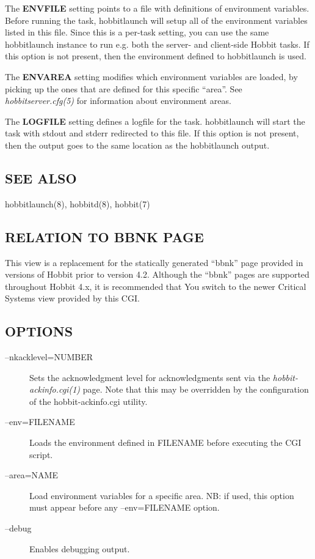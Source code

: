   The \textbf{ENVFILE}
 setting points to a file with definitions of environment
 variables. Before running the task, hobbitlaunch will setup all of
 the environment variables listed in this file. Since this is a
 per-task setting, you can use the same hobbitlaunch instance to run
 e.g. both the server- and client-side Hobbit tasks. If this option is
 not present, then the environment defined to hobbitlaunch is used. 



  The \textbf{ENVAREA}
 setting modifies which environment variables are loaded, by picking
 up the ones that are defined for this specific ``area''. See
 \emph{hobbitserver.cfg(5)} for information about environment areas. 


  The \textbf{LOGFILE}
 setting defines a logfile for the task. hobbitlaunch will start the
 task with stdout and stderr redirected to this file. If this option
 is not present, then the output goes to the same location as the
 hobbitlaunch output. 



 
\subsection{SEE ALSO}
hobbitlaunch(8), hobbitd(8), hobbit(7) 




 
\subsection{RELATION TO BBNK PAGE}
 This view is a replacement for the statically generated ``bbnk'' page
 provided in versions of Hobbit prior to version 4.2. Although the
 ``bbnk'' pages are supported throughout Hobbit 4.x, it is recommended
 that You switch to the newer Critical Systems view provided by this
 CGI. 


 
\subsection{OPTIONS}
\begin{description}
\item[--nkacklevel=NUMBER] Sets the acknowledgment level for
  acknowledgments sent via the \emph{hobbit-ackinfo.cgi(1)} page. Note
  that this may be overridden by the configuration of the
  hobbit-ackinfo.cgi utility. 


 

\item[--env=FILENAME] Loads the environment defined in FILENAME before
  executing the CGI script. 


 

\item[--area=NAME] Load environment variables for a specific area. NB:
  if used, this option must appear before any --env=FILENAME option. 


 

\item[--debug] Enables debugging output. 

 


\end{description}
